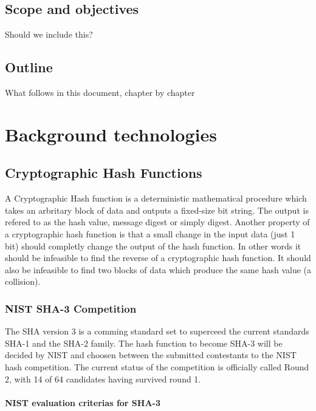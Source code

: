 \documentclass[english,12pt,a4paper]{book}
\begin{document}
\section{Scope and objectives}

Should we include this?

\section{Outline}

What follows in this document, chapter by chapter


\chapter{Background technologies}

\section{Cryptographic Hash Functions}
A Cryptographic Hash function is a deterministic mathematical procedure which
takes an arbritary block of data and outputs a fixed-size bit string. The
output is refered to as the hash value, message digest or simply digest.
Another property of a cryptographic hash function is that a small change in the
input data (just 1 bit) should completly change the output of the hash
function. In other words it should be infeasible to find the reverse of a
cryptographic hash function. It should also be infeasible to find two blocks of
data which produce the same hash value (a collision).

\subsection{NIST SHA-3 Competition}
The \ac{SHA} version 3 is a comming standard set to superceed the current
standards \ac{SHA}-1 and the \ac{SHA}-2 family. The hash function to become
\ac{SHA}-3 will be decided by \ac{NIST} and choosen between the submitted
contestants to the \ac{NIST} hash competition. The current status of the 
competition is officially called Round 2, with 14 of 64 candidates having 
survived round 1\cite{s_fedreg}. 

\subsubsection{\ac{NIST} evaluation criterias for \ac{SHA}-3}
\end{document}
